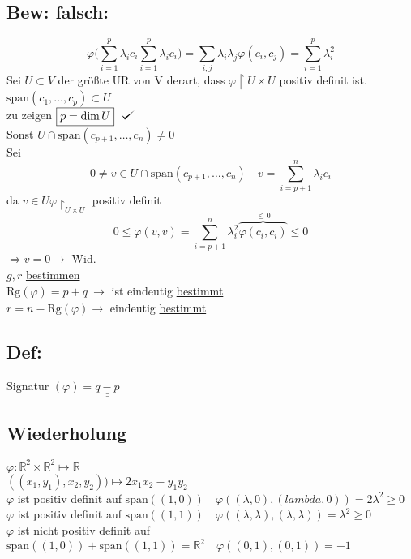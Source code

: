 \documentclass[titlepage,12pt,a4paper,ngerman]{report}
\def\checkmark{\tikz\fill[scale=0.4](0,.35) -- (.25,0) -- (1,.7) -- (.25,.15) -- cycle;}
\newcommand{\tx}[1]{\textrm{#1}}
\newcommand{\ob}[1]{\overbrace{#1}}
\newcommand{\spa}{\tx{span}}
\begin{document}
\subsection{Bew: falsch:}
$$\varphi\bigg( \sum_{i=1}^{p} \lambda_i c_i \sum_{i=1}^{p} \lambda_i c_i\bigg) = \sum_{i,j} \lambda_i \lambda_j \varphi(c_i,c_j) = \sum_{i=1}^{p} \lambda_i^2$$
Sei $ U\subset V $ der größte UR von V derart, dass $ \varphi \upharpoonright U \times U $ positiv definit ist.\\
$ \spa(c_1,\dots,c_p) \subset U $\\
zu zeigen $ \boxed{p = \dim U} \ \ \checkmark$ \\
Sonst $ U \cap \spa (c_{p+1}, \dots , c_n) \neq 0  $\\
Sei $$ 0 \neq  v \in U \cap \spa (c_{p+1},\dots , c_n) \quad v = \sum_{i=p+1}^{n} \lambda_i c_i$$
da $ v \in U \varphi\upharpoonright _{U\times U} $ positiv definit
$$ 0 \le \varphi(v,v) = \sum_{i=p+1}^{n} \lambda_i^2 \ob{\varphi(c_i,c_i)}^{\le 0} \le 0$$
$ \Rightarrow v = 0 \rightarrow $ \underline{Wid}.\\
$ g,r $ \underline{bestimmen}\\
$ \tx{Rg}(\varphi) = \underline{p} + q  \ \rightarrow $ ist eindeutig \underline{bestimmt}\\
$ r = n - \tx{Rg}(\varphi) \rightarrow $ eindeutig \underline{bestimmt}

\subsection{Def:}
Signatur $ (\varphi) = \underline{\underline{q-p}} $



\subsection{Wiederholung}
$ \varphi: \mathbb{R}^2 \times \mathbb{R}^2 \mapsto \mathbb{R} $\\
$ ((x_1,y_1), x_2,y_2) ) \mapsto 2 x_1x_2 - y_1 y_2 $\\
$ \varphi $ ist positiv definit auf $ \spa ((1,0)) \quad \varphi((\lambda,0),(lambda,0)) = 2 \lambda^2 \ge 0$\\
$ \varphi $ ist positiv definit auf $ \spa((1,1)) \quad \varphi((\lambda,\lambda),(\lambda,\lambda)) = \lambda^2 \ge 0 $\\
$ \varphi $ ist nicht positiv definit auf $ \spa((1,0)) + \spa((1,1)) = \mathbb{R}^2 \quad \varphi((0,1),(0,1)) = -1 $\\
\end{document}
